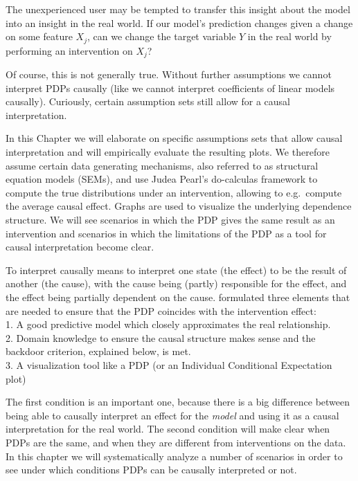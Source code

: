 \documentclass[]{krantz}
\begin{document}
The unexperienced user may be tempted to transfer this insight about the
model into an insight in the real world. If our model's prediction
changes given a change on some feature \(X_j\), can we change the target
variable \(Y\) in the real world by performing an intervention on
\(X_j\)?

Of course, this is not generally true. Without further assumptions we
cannot interpret PDPs causally (like we cannot interpret coefficients of
linear models causally). Curiously, certain assumption sets still allow
for a causal interpretation.

In this Chapter we will elaborate on specific assumptions sets that
allow causal interpretation and will empirically evaluate the resulting
plots. We therefore assume certain data generating mechanisms, also
referred to as structural equation models (SEMs), and use Judea Pearl's
do-calculas framework to compute the true distributions under an
intervention, allowing to e.g.~compute the average causal effect. Graphs
are used to visualize the underlying dependence structure. We will see
scenarios in which the PDP gives the same result as an intervention and
scenarios in which the limitations of the PDP as a tool for causal
interpretation become clear.

To interpret causally means to interpret one state (the effect) to be
the result of another (the cause), with the cause being (partly)
responsible for the effect, and the effect being partially dependent on
the cause. \citep{zhaohastie} formulated three elements that are needed
to ensure that the PDP coincides with the intervention effect:\\
1. A good predictive model which closely approximates the real
relationship.\\
2. Domain knowledge to ensure the causal structure makes sense and the
backdoor criterion, explained below, is met.\\
3. A visualization tool like a PDP (or an Individual Conditional
Expectation plot)

The first condition is an important one, because there is a big
difference between being able to causally interpret an effect for the
\emph{model} and using it as a causal interpretation for the real world.
The second condition will make clear when PDPs are the same, and when
they are different from interventions on the data. In this chapter we
will systematically analyze a number of scenarios in order to see under
which conditions PDPs can be causally interpreted or not.
\end{document}
